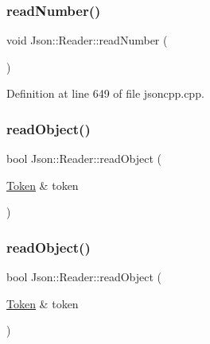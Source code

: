 \hypertarget{class_json_1_1_reader_afb31bfda6bb27d6453057a47655e8363}{}\label{class_json_1_1_reader_afb31bfda6bb27d6453057a47655e8363} 
\subsubsection{\texorpdfstring{read\+Number()}{readNumber()}\hspace{0.1cm}{\footnotesize\ttfamily [2/2]}}
{\footnotesize\ttfamily void Json\+::\+Reader\+::read\+Number (\begin{DoxyParamCaption}{ }\end{DoxyParamCaption})\hspace{0.3cm}{\ttfamily [private]}}



Definition at line 649 of file jsoncpp.\+cpp.

\hypertarget{class_json_1_1_reader_a0068eb3d8e86e91f0e4806f60da66b9c}{}\label{class_json_1_1_reader_a0068eb3d8e86e91f0e4806f60da66b9c} 
\subsubsection{\texorpdfstring{read\+Object()}{readObject()}\hspace{0.1cm}{\footnotesize\ttfamily [1/2]}}
{\footnotesize\ttfamily bool Json\+::\+Reader\+::read\+Object (\begin{DoxyParamCaption}\item[{\hyperlink{class_json_1_1_reader_1_1_token}{Token} \&}]{token }\end{DoxyParamCaption})\hspace{0.3cm}{\ttfamily [private]}}

\hypertarget{class_json_1_1_reader_a0068eb3d8e86e91f0e4806f60da66b9c}{}\label{class_json_1_1_reader_a0068eb3d8e86e91f0e4806f60da66b9c} 
\subsubsection{\texorpdfstring{read\+Object()}{readObject()}\hspace{0.1cm}{\footnotesize\ttfamily [2/2]}}
{\footnotesize\ttfamily bool Json\+::\+Reader\+::read\+Object (\begin{DoxyParamCaption}\item[{\hyperlink{class_json_1_1_reader_1_1_token}{Token} \&}]{token }\end{DoxyParamCaption})\hspace{0.3cm}{\ttfamily [private]}}



